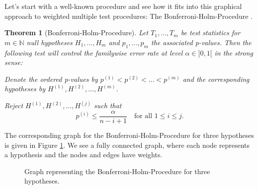 \documentclass[a4paper, 11pt]{article}
\numberwithin{equation}{section}
\theoremstyle{definition}
\theoremstyle{plain}
\newtheorem{Theorem}[Def]{Theorem}
\newcommand{\N}{\ensuremath{\mathbb{N}}\xspace}
\begin{document}
Let's start with a well-known procedure and see how it fits into this
graphical approach to weighted multiple test procedures: The
Bonferroni-Holm-Procedure \cite{Holm79}.

\begin{Theorem}[Bonferroni-Holm-Procedure] 
Let $T_1, \ldots, T_m$
be test statistics for $m\in\N$ null hypotheses $H_1, \ldots, H_m$ and
$p_1, \ldots, p_m$ the associated p-values. Then the following test
will control the familywise error rate at level $\alpha\in]0,1[$ in
    the strong sense:

Denote the ordered p-values by $p^{(1)}<p^{(2)}<\ldots<p^{(m)}$ 
and the corresponding hypotheses by $H^{(1)},H^{(2)},\ldots, H^{(m)}$.

Reject $H^{(1)},H^{(2)},\ldots, H^{(j)}$ such that 
\[p^{(i)}\leq\frac{\alpha}{n-i+1}\quad\text{for all $1\leq i\leq j$}.\]
\end{Theorem}

The corresponding graph for the Bonferroni-Holm-Procedure for three
hypotheses is given in Figure \ref{exampleHolm}.  We see a fully
connected graph, where each node represents a hypothesis and the nodes
and edges have weights.

\begin{figure}[ht]
  \centering
{\tiny
{}

}  \caption{\label{exampleHolm} Graph representing the
    Bonferroni-Holm-Procedure for three hypotheses.}
\end{figure}
\end{document}
